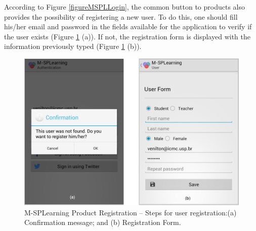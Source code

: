 According to Figure \ref{figureMSPLLogin}, the common button to products also provides the possibility of registering a new user. To do this, one should fill his/her email and password in the fields available for the application to verify if the user exists (Figure \ref{figureMSPLRegister} (a)). If not, the registration form is displayed with the information previously typed (Figure \ref{figureMSPLRegister} (b)).

\begin{figure}[!ht]
\centering
\includegraphics[scale=0.335]{figures/section3/MSPLRegister}
\caption{M-SPLearning Product Registration -- Steps for user registration:\newline(a) Confirmation message; and (b) Registration Form.}
\label{figureMSPLRegister}
\end{figure}

